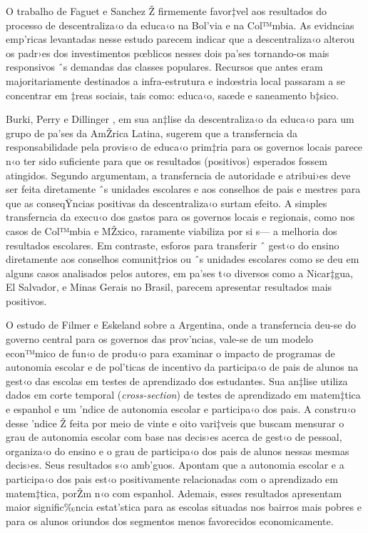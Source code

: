 \documentclass[a4paper, 12pt]{article}
\begin{document}
O trabalho de Faguet e Sanchez Ž firmemente favor‡vel aos resultados do processo de descentraliza‹o da educa‹o na Bol’via e na Col™mbia. As evidncias emp’ricas levantadas nesse estudo parecem indicar que a descentraliza‹o alterou os padr›es dos investimentos pœblicos nesses dois pa’ses tornando-os mais responsivos ˆs demandas das classes populares. Recursos que antes eram majoritariamente destinados a infra-estrutura e indœstria local passaram a se concentrar em ‡reas sociais, tais como: educa‹o, saœde e saneamento b‡sico.

Burki, Perry e Dillinger \citeyear{burki_beyond_1999}, em sua an‡lise da descentraliza‹o da educa‹o para um grupo de pa’ses da AmŽrica Latina, sugerem que a transferncia da responsabilidade pela provis‹o de educa‹o prim‡ria para os governos locais parece n‹o ter sido suficiente para que os resultados (positivos) esperados fossem atingidos. Segundo argumentam, a transferncia de autoridade e atribui›es deve ser feita diretamente ˆs unidades escolares e aos conselhos de pais e mestres para que as conseqŸncias positivas da descentraliza‹o surtam efeito. A simples transferncia da execu‹o dos gastos para os governos locais e regionais, como nos casos de Col™mbia e MŽxico, raramente viabiliza por si s— a melhoria dos resultados escolares. Em contraste, esforos para transferir ˆ gest‹o do ensino diretamente aos conselhos comunit‡rios ou ˆs unidades escolares como se deu em alguns casos analisados pelos autores, em pa’ses t‹o diversos como a Nicar‡gua, El Salvador, e Minas Gerais no Brasil, parecem apresentar resultados mais positivos.

O estudo de Filmer e Eskeland \citeyear{filmer_autonomy_2002} sobre a Argentina, onde a transferncia deu-se do governo central para os governos das prov’ncias, vale-se de um modelo econ™mico de fun‹o de produ‹o para examinar o impacto de programas de autonomia escolar e de pol’ticas de incentivo da participa‹o de pais de alunos na gest‹o das escolas em testes de aprendizado dos estudantes. Sua an‡lise utiliza dados em corte temporal (\emph{cross-section}) de testes de aprendizado em matem‡tica e espanhol e um ’ndice de autonomia escolar e participa‹o dos pais. A constru‹o desse ’ndice Ž feita por meio de vinte e oito vari‡veis que buscam mensurar o grau de autonomia escolar com base nas decis›es acerca de gest‹o de pessoal, organiza‹o do ensino e o grau de participa‹o dos pais de alunos nessas mesmas decis›es. Seus resultados s‹o amb’guos. Apontam que a autonomia escolar e a participa‹o dos pais est‹o positivamente relacionadas com o aprendizado em matem‡tica, porŽm n‹o com espanhol. Ademais, esses resultados apresentam maior signific‰ncia estat’stica para as escolas situadas nos bairros mais pobres e para os alunos oriundos dos segmentos menos favorecidos economicamente.
\end{document}

